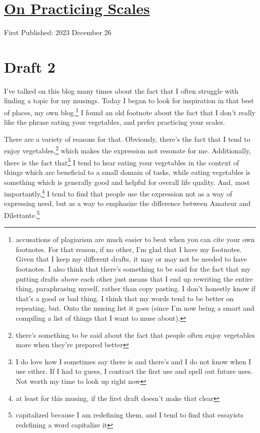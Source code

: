 \documentclass[12pt]{article}[titlepage]
\newcommand{\1}{\={a}}
\newcommand{\2}{\={e}}
\newcommand{\3}{\={\i}}
\newcommand{\4}{\=o}
\newcommand{\5}{\=u}
\newcommand{\6}{\={A}}
\renewcommand{\,}{\textsuperscript{,}}
\begin{document}
\doublespacing
\section{\href{practicing-scales.html}{On Practicing Scales}}
First Published: 2023 December 26
\section{Draft 2}
I've talked on this blog many times about the fact that I often struggle with finding a topic for my musings.
Today I began to look for inspiration in that best of places, my own blog.\footnote{accusations of plagiarism are much easier to beat when you can cite your own footnotes.
For that reason, if no other, I'm glad that I have my footnotes.
Given that I keep my different drafts, it may or may not be needed to have footnotes.
I also think that there's something to be said for the fact that my putting drafts above each other just means that I end up rewriting the entire thing, paraphrasing myself, rather than copy pasting.
I don't honestly know if that's a good or bad thing.
I think that my words tend to be better on repeating, but.
Onto the musing list it goes (since I'm now being a smart and compiling a list of things that I want to muse about).}
I found an old footnote about the fact that I don't really like the phrase eating your vegetables, and prefer practicing your scales.

There are a variety of reasons for that.
Obviously, there's the fact that I tend to enjoy vegetables,\footnote{there's something to be said about the fact that people often enjoy vegetables more when they're prepared better} which makes the expression not resonate for me.
Additionally, there is the fact that\footnote{I do love how I sometimes say there is and there's and I do not know when I use either. If I had to guess, I contract the first use and spell out future uses. Not worth my time to look up right now} I tend to hear eating your vegetables in the context of things which are beneficial to a small domain of tasks, while eating vegetables is something which is generally good and helpful for overall life quality.
And, most importantly,\footnote{at least for this musing, if the first draft doesn't make that clear} I tend to find that people use the expression not as a way of expressing need, but as a way to emphasize the difference between Amateur and Dilettante.\footnote{capitalized because I am redefining them, and I tend to find that essayists redefining a word capitalize it}
\end{document}
